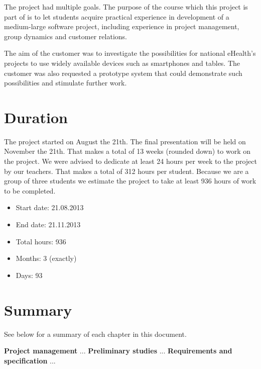 The project had multiple goals.
The purpose of the course which this project is part of is to let students acquire practical experience in development of a medium-large software project, including experience in project management, group dynamics and customer relations.

The aim of the customer was to investigate the possibilities for national eHealth's projects to use widely available devices such as smartphones and tables. The customer was also requested a prototype system that could demonstrate such possibilities and stimulate further work.

\section{Duration}
\label{section:duration}
The project started on August the 21th. The final presentation will be held on November the 21th. That makes a total of 13 weeks (rounded down) to work on the project. We were advised to dedicate at least 24 hours per week to the project by our teachers. %
That makes a total of 312 hours per student. Because we are a group of three students we estimate the project to take at least 936 hours of work to be completed.

\begin{itemize}
\item Start date: 21.08.2013
\item End date: 21.11.2013
\item Total hours: 936
\item Months: 3 (exactly)
\item Days: 93
\end{itemize}





\section{Summary}

See below for a summary of each chapter in this document.

\textbf{Project management}\newline
...
\textbf{Preliminary studies}\newline
...
\textbf{Requirements and specification}\newline
...